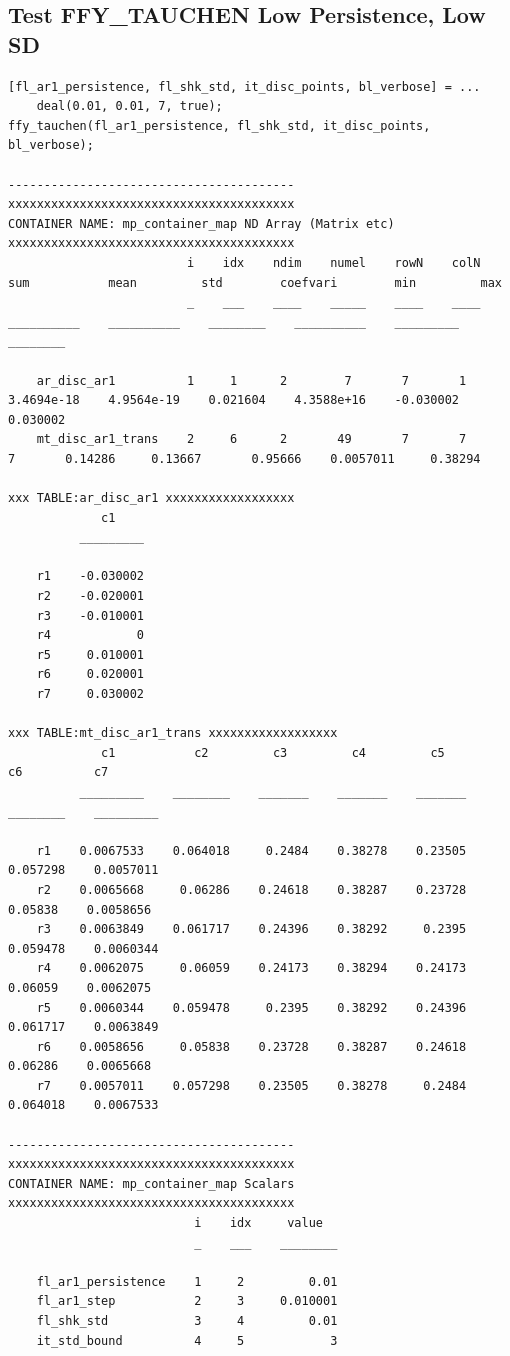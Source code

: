 \documentclass[
]{book}
\begin{document}
\hypertarget{test-ffy_tauchen-low-persistence-low-sd}{%
\subsection{Test FFY\_TAUCHEN Low Persistence, Low SD}\label{test-ffy_tauchen-low-persistence-low-sd}}

\begin{verbatim}
[fl_ar1_persistence, fl_shk_std, it_disc_points, bl_verbose] = ...
    deal(0.01, 0.01, 7, true);
ffy_tauchen(fl_ar1_persistence, fl_shk_std, it_disc_points, bl_verbose);

----------------------------------------
xxxxxxxxxxxxxxxxxxxxxxxxxxxxxxxxxxxxxxxx
CONTAINER NAME: mp_container_map ND Array (Matrix etc)
xxxxxxxxxxxxxxxxxxxxxxxxxxxxxxxxxxxxxxxx
                         i    idx    ndim    numel    rowN    colN       sum           mean         std        coefvari        min         max   
                         _    ___    ____    _____    ____    ____    __________    __________    ________    __________    _________    ________

    ar_disc_ar1          1     1      2        7       7       1      3.4694e-18    4.9564e-19    0.021604    4.3588e+16    -0.030002    0.030002
    mt_disc_ar1_trans    2     6      2       49       7       7               7       0.14286     0.13667       0.95666    0.0057011     0.38294

xxx TABLE:ar_disc_ar1 xxxxxxxxxxxxxxxxxx
             c1    
          _________

    r1    -0.030002
    r2    -0.020001
    r3    -0.010001
    r4            0
    r5     0.010001
    r6     0.020001
    r7     0.030002

xxx TABLE:mt_disc_ar1_trans xxxxxxxxxxxxxxxxxx
             c1           c2         c3         c4         c5          c6          c7    
          _________    ________    _______    _______    _______    ________    _________

    r1    0.0067533    0.064018     0.2484    0.38278    0.23505    0.057298    0.0057011
    r2    0.0065668     0.06286    0.24618    0.38287    0.23728     0.05838    0.0058656
    r3    0.0063849    0.061717    0.24396    0.38292     0.2395    0.059478    0.0060344
    r4    0.0062075     0.06059    0.24173    0.38294    0.24173     0.06059    0.0062075
    r5    0.0060344    0.059478     0.2395    0.38292    0.24396    0.061717    0.0063849
    r6    0.0058656     0.05838    0.23728    0.38287    0.24618     0.06286    0.0065668
    r7    0.0057011    0.057298    0.23505    0.38278     0.2484    0.064018    0.0067533

----------------------------------------
xxxxxxxxxxxxxxxxxxxxxxxxxxxxxxxxxxxxxxxx
CONTAINER NAME: mp_container_map Scalars
xxxxxxxxxxxxxxxxxxxxxxxxxxxxxxxxxxxxxxxx
                          i    idx     value  
                          _    ___    ________

    fl_ar1_persistence    1     2         0.01
    fl_ar1_step           2     3     0.010001
    fl_shk_std            3     4         0.01
    it_std_bound          4     5            3
\end{verbatim}
\end{document}
